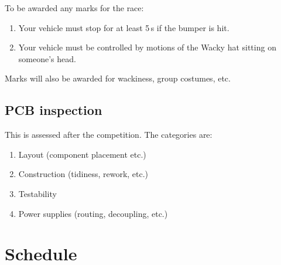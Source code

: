 \documentclass[11pt, a4paper]{article}
\begin{document}

To be awarded any marks for the race:
%
\begin{enumerate}
\item Your vehicle must stop for at least 5\,s if the bumper is hit.

\item Your vehicle must be controlled by motions of the Wacky hat
  sitting on someone's head.
\end{enumerate}

Marks will also be awarded for wackiness, group costumes, etc.


\subsection{PCB inspection}

This is assessed after the competition.  The categories are:
%
\begin{enumerate}
\item Layout (component placement etc.)
\item Construction (tidiness, rework, etc.)
\item Testability
\item Power supplies (routing, decoupling, etc.)
\end{enumerate}


\section{Schedule}
\end{document}
